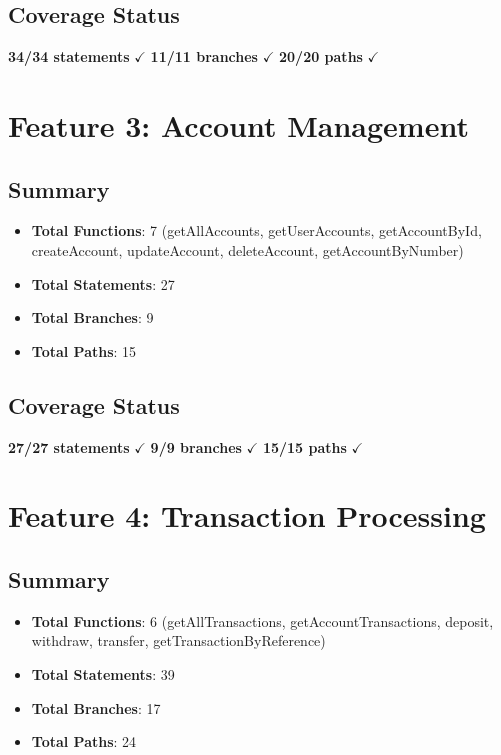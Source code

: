 \subsection{Coverage Status}
\begin{center}
\textbf{34/34 statements} $\checkmark$ \quad \textbf{11/11 branches} $\checkmark$ \quad \textbf{20/20 paths} $\checkmark$
\end{center}

\section{Feature 3: Account Management}

\subsection{Summary}
\begin{itemize}
    \item \textbf{Total Functions}: 7 (getAllAccounts, getUserAccounts, getAccountById, createAccount, updateAccount, deleteAccount, getAccountByNumber)
    \item \textbf{Total Statements}: 27
    \item \textbf{Total Branches}: 9
    \item \textbf{Total Paths}: 15
\end{itemize}

\subsection{Coverage Status}
\begin{center}
\textbf{27/27 statements} $\checkmark$ \quad \textbf{9/9 branches} $\checkmark$ \quad \textbf{15/15 paths} $\checkmark$
\end{center}

\section{Feature 4: Transaction Processing}

\subsection{Summary}
\begin{itemize}
    \item \textbf{Total Functions}: 6 (getAllTransactions, getAccountTransactions, deposit, withdraw, transfer, getTransactionByReference)
    \item \textbf{Total Statements}: 39
    \item \textbf{Total Branches}: 17
    \item \textbf{Total Paths}: 24
\end{itemize}


